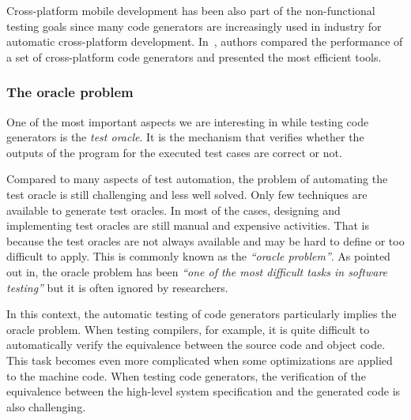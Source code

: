 Cross-platform mobile development has been also part of the non-functional testing goals since many code generators are increasingly used in industry for automatic cross-platform development. In~\cite{pazirandeh2015evaluation,hartmann2011cross}, authors compared the performance of a set of cross-platform code generators and presented the most efficient tools.



\subsubsection{The oracle problem}
\label{sec:The oracle problem}


One of the most important aspects we are interesting in while testing code generators is the \textit{test oracle}. It is the mechanism that verifies whether the outputs of the program for the executed test cases are correct or not.

Compared to many aspects of test automation, the problem of automating the test oracle is still challenging and less well solved. Only few techniques are available to generate test oracles. In most of the cases, designing and implementing test oracles are still manual and expensive activities. That is because the test oracles are not always available and may be hard to define or too difficult to apply\cite{barr2015oracle}. This is commonly known as the \textit{``oracle problem''}. 
As pointed out in\cite{manolache2001software}, the oracle problem has been \textit{``one of the most difficult tasks in software testing''} but it is often ignored by researchers.

In this context, the automatic testing of code generators particularly implies the oracle problem. When testing compilers, for example, it is quite difficult to automatically verify the equivalence between the source code and object code. This task becomes even more complicated when some optimizations are applied to the machine code. 
When testing code generators, the verification of the equivalence between the high-level system specification and the generated code is also challenging.  

